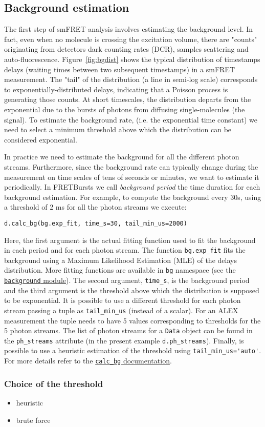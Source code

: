 \subsection{Background estimation}

The first step of smFRET analysis involves estimating the background level. In fact, even when no molecule is crossing the excitation volume, there are "counts" originating from detectors dark counting rates (DCR), samples scattering and auto-fluorescence. Figure~\ref{fig:bgdist} shows the typical distribution of timestamps delays (waiting times between two subsequent timestamps) in a smFRET measurement. The "tail" of the distribution (a line in semi-log scale) corresponds to exponentially-distributed delays, indicating that a Poisson process is generating those counts. At short timescales, the distribution departs from the exponential due to the bursts of photons from diffusing single-molecules (the signal).
To estimate the background rate, (i.e. the exponential time constant) we need to select a minimum threshold above which the distribution can be considered exponential. 

In practice we need to estimate the background for all the different photon streams. Furthermore, since the background rate can typically change during the measurement on time scales of tens of seconds or minutes, we want to estimate it periodically. 
In FRETBursts we call \textit{background period} the time duration for each background estimation. For example, to compute the background every 30s, using a threshold of 2 ms for all the photon streams we execute:

\begin{verbatim}
d.calc_bg(bg.exp_fit, time_s=30, tail_min_us=2000)
\end{verbatim}

Here, the first argument is the actual fitting function used to fit the
background in each period and for each photon stream. The function 
\verb|bg.exp_fit| fits the background using a Maximum Likelihood Estimation 
(MLE) of the delays distribution. More fitting functions are available in 
\verb|bg| namespace (see the 
\href{http://fretbursts.readthedocs.org/en/latest/background.html}
{\texttt{background} module}). The second argument, \verb|time_s|, is the background 
period and the third argument is the threshold above which the distribution 
is supposed to be exponential. It is possible to use a different threshold 
for each photon stream passing a tuple as \verb|tail_min_us| (instead 
of a scalar). For an ALEX measurement the tuple needs to have 5 values 
corresponding to thresholds for the 5 photon streams. The list of photon 
streams for a \verb|Data| object can be found in the \verb|ph_streams| 
attribute (in the present example \verb|d.ph_streams|). Finally, is 
possible to use a heuristic estimation of the threshold using 
\verb|tail_min_us='auto'|. For more details refer to the 
\href{http://fretbursts.readthedocs.org/en/latest/data_class.html#fretbursts.burstlib.Data.calc_bg}{\texttt{calc\_bg} documentation}.

\subsubsection{Choice of the threshold}
\begin{itemize}
\item heuristic
\item brute force
\end{itemize}
